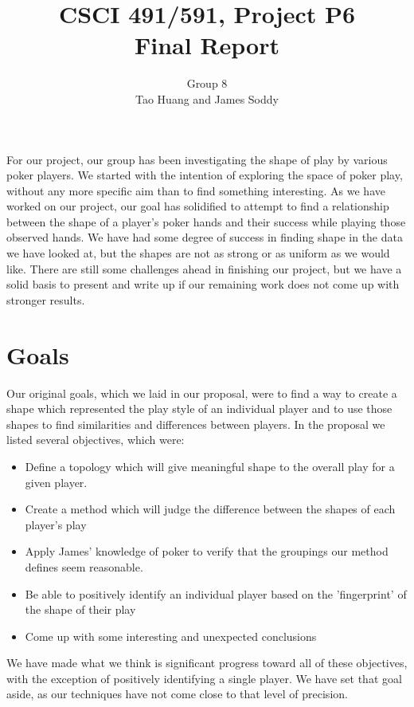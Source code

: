 \documentclass[11pt]{article}
\title{CSCI 491/591, Project P6\\
		\small{Final Report}}
\author{Group 8\\
		\small{Tao Huang and James Soddy}}
\begin{document}
\maketitle

For our project, our group has been investigating the shape of play by various
poker players. We started with the intention of exploring the space of poker
play, without any more specific aim than to find something interesting. As we
have worked on our project, our goal has solidified to attempt to find a 
relationship between the shape of a player's poker hands and their success
while playing those observed hands. We have had some degree of success in finding
shape in the data we have looked at, but the shapes are not as strong or as 
uniform as we would like. There are still some challenges ahead in finishing our
project, but we have a solid basis to present and write up if our remaining work
does not come up with stronger results.

\section*{Goals}
Our original goals, which we laid in our proposal, were to find a way to create
a shape which represented the play style of an individual player and to use those
shapes to find similarities and differences between players. In the proposal
we listed several objectives, which were:

\begin{itemize}[noitemsep]
	\item Define a topology which will give meaningful shape to the overall play
	for a given player.
	\item Create a method which will judge the difference between the shapes of
	each player's play
	\item Apply James' knowledge of poker to verify that the groupings our method
	defines seem reasonable.
	\item Be able to positively identify an individual player based on the
	'fingerprint' of the shape of their play
	\item Come up with some interesting and unexpected conclusions
\end{itemize}

We have made what we think is significant progress toward all of these
objectives, with the exception of positively identifying a single player. We have
set that goal aside, as our techniques have not come close to that level of
precision.
\end{document}
